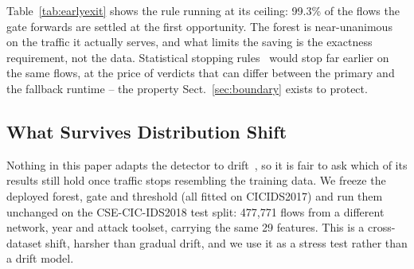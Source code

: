 \documentclass[runningheads]{llncs}
\begin{document}
Table~\ref{tab:earlyexit} shows the rule running at its ceiling: 99.3\% of the flows the gate forwards are settled at the first opportunity. The forest is near-unanimous on the traffic it actually serves, and what limits the saving is the exactness requirement, not the data. Statistical stopping rules~\cite{hernandezlobato2009pruning,wang2018qwyc} would stop far earlier on the same flows, at the price of verdicts that can differ between the primary and the fallback runtime -- the property Sect.~\ref{sec:boundary} exists to protect.

\subsection{What Survives Distribution Shift}
\label{sec:drift}

Nothing in this paper adapts the detector to drift~\cite{gama2014survey}, so it is fair to ask which of its results still hold once traffic stops resembling the training data. We freeze the deployed forest, gate and threshold (all fitted on CICIDS2017) and run them unchanged on the CSE-CIC-IDS2018 test split: 477{,}771 flows from a different network, year and attack toolset, carrying the same 29 features. This is a cross-dataset shift, harsher than gradual drift, and we use it as a stress test rather than a drift model.
\end{document}
